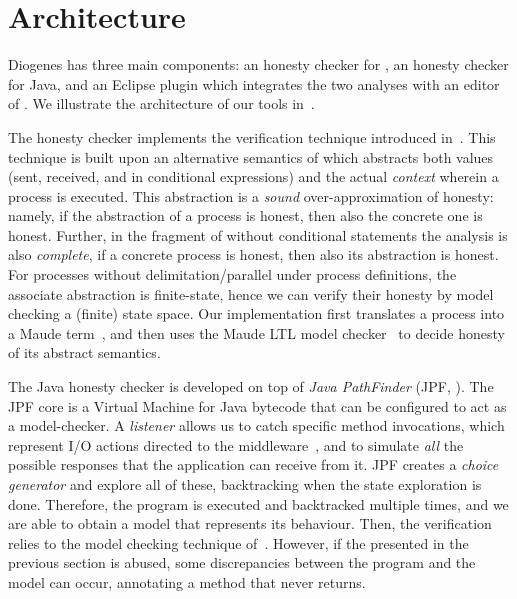 \section{Architecture}

Diogenes has three main components:
an honesty checker for \coco,
an honesty checker for Java,
and an Eclipse plugin which integrates the two analyses
with an editor of \coco.
We illustrate the architecture of our tools in~.

The \coco honesty checker implements the  
verification technique introduced in~\cite{BMSZ15jlamp}.
This technique is built upon an alternative semantics of \coco 
which abstracts both values (sent, received, and in conditional expressions) 
and the actual \emph{context} wherein a process is executed.
This abstraction is a \emph{sound} over-approximation of honesty:
namely, if the abstraction of a process is honest,
then also the concrete one is honest.
Further, in the fragment of \coco without conditional statements
the analysis is also \emph{complete},
\ie if a concrete process is honest, then also its abstraction is honest.
For processes without delimitation/parallel under process definitions,
the associate abstraction is finite-state, 
hence we can verify their honesty by model checking a (finite) state space.
Our implementation 
first translates a \coco process into a Maude term~\cite{Maude01}, 
and then uses the Maude LTL model checker~\cite{Eker02maude}
to decide honesty of its abstract semantics.

The Java honesty checker is developed on top of \emph{Java PathFinder}
(JPF, \cite{lerda2001addressing,visser2003model}).
The JPF core is a Virtual Machine for Java bytecode
that can be configured to act as a model-checker.
%
A \emph{listener} allows us to catch specific method invocations, 
which represent I/O actions
directed to the middleware~\cite{CO2middleware},
and to simulate \emph{all} the possible responses that 
the application can receive from it.
%
JPF creates a \emph{choice generator} and explore all of these,
backtracking when the state exploration is done.
%
Therefore, the program is executed and backtracked multiple times,
and we are able to obtain a \coco model that represents its behaviour.
Then, the verification relies to the model checking technique of~\cite{BMSZ15jlamp}.
%
However, if the  presented in the previous section
is abused, some discrepancies between the program and the model
can occur, \eg annotating a method that never returns.


